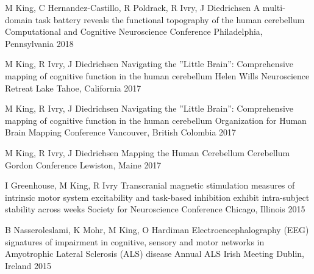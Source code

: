 \begin{cventries}
  \cventry
    {M King, C Hernandez-Castillo, R Poldrack, R Ivry, J Diedrichsen} %
    {A multi-domain task battery reveals the functional topography of the human cerebellum} %
    {Computational and Cognitive Neuroscience Conference} %
    {Philadelphia, Pennsylvania} %
    {2018} %
    
  \cventry
    {M King, R Ivry, J Diedrichsen} %
    {Navigating the ”Little Brain”: Comprehensive mapping of cognitive function in the human cerebellum} %
    {Helen Wills Neuroscience Retreat} %
    {Lake Tahoe, California} %
    {2017} %
    
  \cventry
    {M King, R Ivry, J Diedrichsen} %
    {Navigating the ”Little Brain”: Comprehensive mapping of cognitive function in the human cerebellum} %
    {Organization for Human Brain Mapping Conference} %
    {Vancouver, British Colombia} %
    {2017} %
    
  \cventry
    {M King, R Ivry, J Diedrichsen} %
    {Mapping the Human Cerebellum} %
    {Cerebellum Gordon Conference} %
    {Lewiston, Maine} %
    {2017} %
    
  \cventry
    {I Greenhouse, M King, R Ivry} %
    {Transcranial magnetic stimulation measures of intrinsic motor system excitability and task-based inhibition exhibit intra-subject stability across weeks} %
    {Society for Neuroscience Conference} %
    {Chicago, Illinois} %
    {2015} %
    
  \cventry
    {B Nasseroleslami, K Mohr, M King, O Hardiman} %
    {Electroencephalography (EEG) signatures of impairment in cognitive, sensory and motor networks in Amyotrophic Lateral Sclerosis (ALS) disease}%
    {Annual ALS Irish Meeting} %
    {Dublin, Ireland} %
    {2015} %

\end{cventries}
